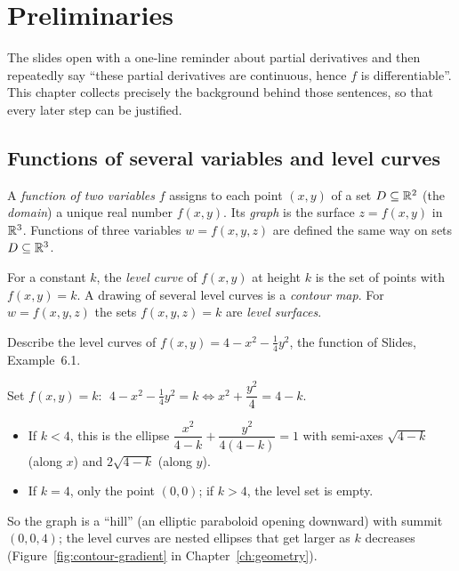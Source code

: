 \section{Preliminaries}\label{ch:prelim}

The slides open with a one-line reminder about partial derivatives and then
repeatedly say ``these partial derivatives are continuous, hence $f$ is
differentiable''. This chapter collects precisely the background behind those
sentences, so that every later step can be justified.

\subsection{Functions of several variables and level curves}

\begin{definition}
A \emph{function of two variables} $f$ assigns to each point $(x,y)$ of a set
$D\subseteq\mathbb{R}^2$ (the \emph{domain}) a unique real number $f(x,y)$. Its
\emph{graph} is the surface $z=f(x,y)$ in $\mathbb{R}^3$. Functions of three variables
$w=f(x,y,z)$ are defined the same way on sets $D\subseteq\mathbb{R}^3$.
\end{definition}

\begin{definition}
For a constant $k$, the \emph{level curve} of $f(x,y)$ at height $k$ is the set
of points with $f(x,y)=k$. A drawing of several level curves is a \emph{contour
map}. For $w=f(x,y,z)$ the sets $f(x,y,z)=k$ are \emph{level surfaces}.
\end{definition}

\begin{example}\label{ex:levelcurves}
Describe the level curves of $f(x,y)=4-x^2-\tfrac14 y^2$, the function of
Slides, Example~6.1.
\end{example}
\begin{solution}
Set $f(x,y)=k$: $\;4-x^2-\tfrac14y^2=k \iff x^2+\dfrac{y^2}{4}=4-k.$
\begin{itemize}
  \item If $k<4$, this is the ellipse $\dfrac{x^2}{4-k}+\dfrac{y^2}{4(4-k)}=1$ with
        semi-axes $\sqrt{4-k}$ (along $x$) and $2\sqrt{4-k}$ (along $y$).
  \item If $k=4$, only the point $(0,0)$; if $k>4$, the level set is empty.
\end{itemize}
So the graph is a ``hill'' (an elliptic paraboloid opening downward) with summit
$(0,0,4)$; the level curves are nested ellipses that get larger as $k$
decreases (Figure~\ref{fig:contour-gradient} in Chapter~\ref{ch:geometry}).
\end{solution}

